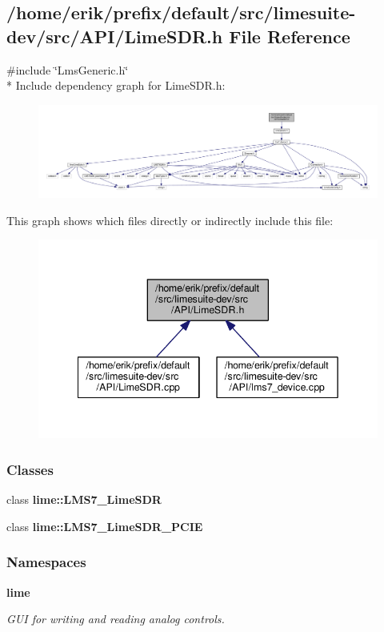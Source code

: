 \subsection{/home/erik/prefix/default/src/limesuite-\/dev/src/\+A\+P\+I/\+Lime\+S\+DR.h File Reference}
\label{LimeSDR_8h}
{\ttfamily \#include \char`\"{}Lms\+Generic.\+h\char`\"{}}\\*
Include dependency graph for Lime\+S\+D\+R.\+h\+:
\nopagebreak
\begin{figure}[H]
\begin{center}
\leavevmode
\includegraphics[width=350pt]{d7/d87/LimeSDR_8h__incl}
\end{center}
\end{figure}
This graph shows which files directly or indirectly include this file\+:
\nopagebreak
\begin{figure}[H]
\begin{center}
\leavevmode
\includegraphics[width=342pt]{de/d40/LimeSDR_8h__dep__incl}
\end{center}
\end{figure}
\subsubsection*{Classes}
\begin{DoxyCompactItemize}
\item 
class {\bf lime\+::\+L\+M\+S7\+\_\+\+Lime\+S\+DR}
\item 
class {\bf lime\+::\+L\+M\+S7\+\_\+\+Lime\+S\+D\+R\+\_\+\+P\+C\+IE}
\end{DoxyCompactItemize}
\subsubsection*{Namespaces}
\begin{DoxyCompactItemize}
\item 
 {\bf lime}
\begin{DoxyCompactList}\small\item\em G\+UI for writing and reading analog controls. \end{DoxyCompactList}\end{DoxyCompactItemize}
